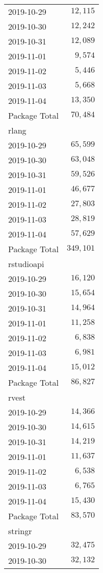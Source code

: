 \documentclass[]{article}
\begin{document}
\begin{longtable}{lr}
\midrule
2019-10-29 & $12,115$ \\ 
2019-10-30 & $12,242$ \\ 
2019-10-31 & $12,089$ \\ 
2019-11-01 & $9,574$ \\ 
2019-11-02 & $5,446$ \\ 
2019-11-03 & $5,668$ \\ 
2019-11-04 & $13,350$ \\ 
\midrule 
Package Total & $70,484$ \\ 
\midrule
\multicolumn{1}{l}{rlang} \\ 
\midrule
2019-10-29 & $65,599$ \\ 
2019-10-30 & $63,048$ \\ 
2019-10-31 & $59,526$ \\ 
2019-11-01 & $46,677$ \\ 
2019-11-02 & $27,803$ \\ 
2019-11-03 & $28,819$ \\ 
2019-11-04 & $57,629$ \\ 
\midrule 
Package Total & $349,101$ \\ 
\midrule
\multicolumn{1}{l}{rstudioapi} \\ 
\midrule
2019-10-29 & $16,120$ \\ 
2019-10-30 & $15,654$ \\ 
2019-10-31 & $14,964$ \\ 
2019-11-01 & $11,258$ \\ 
2019-11-02 & $6,838$ \\ 
2019-11-03 & $6,981$ \\ 
2019-11-04 & $15,012$ \\ 
\midrule 
Package Total & $86,827$ \\ 
\midrule
\multicolumn{1}{l}{rvest} \\ 
\midrule
2019-10-29 & $14,366$ \\ 
2019-10-30 & $14,615$ \\ 
2019-10-31 & $14,219$ \\ 
2019-11-01 & $11,637$ \\ 
2019-11-02 & $6,538$ \\ 
2019-11-03 & $6,765$ \\ 
2019-11-04 & $15,430$ \\ 
\midrule 
Package Total & $83,570$ \\ 
\midrule
\multicolumn{1}{l}{stringr} \\ 
\midrule
2019-10-29 & $32,475$ \\ 
2019-10-30 & $32,132$ \\ 

\end{longtable}
\end{document}
